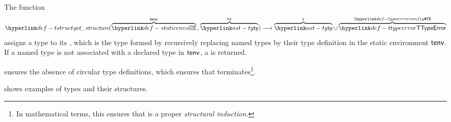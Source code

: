 \hypertarget{def-structure}{}
The function
\[
  \tstruct(\overname{\staticenvs}{\tenv} \aslsep \overname{\ty}{\tty}) \aslto \overname{\ty}{\vt} \cup \overname{\TTypeError}{\TypeErrorConfig}
\]
assigns a type to its \hypertarget{def-tstruct}{\emph{\structure}}, which is the type formed by
recursively replacing named types by their type definition in the static environment $\textsf{tenv}$.
If a named type is not associated with a declared type in $\textsf{tenv}$, a \typingerrorterm{} is returned.

 ensures the absence of circular type definitions,
which ensures that  terminates\footnote{In mathematical terms,
this ensures that  is a proper \emph{structural induction.}}.

 shows examples of types and their structures.

